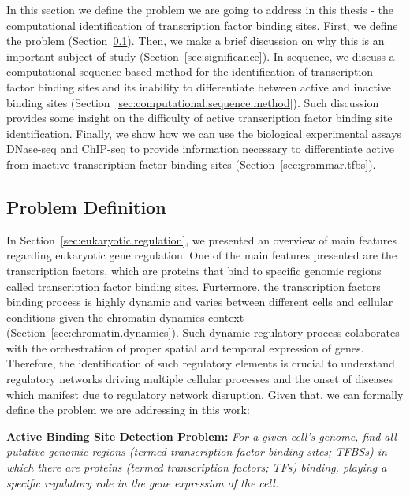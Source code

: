 In this section we define the problem we are going to address in this thesis - the computational identification of transcription factor binding sites. First, we define the problem (Section~\ref{sec:problem.definition}). Then, we make a brief discussion on why this is an important subject of study (Section~\ref{sec:significance}). In sequence, we discuss a computational sequence-based method for the identification of transcription factor binding sites and its inability to differentiate between active and inactive binding sites (Section~\ref{sec:computational.sequence.method}). Such discussion provides some insight on the difficulty of active transcription factor binding site identification. Finally, we show how we can use the biological experimental assays DNase-seq and ChIP-seq to provide information necessary to differentiate active from inactive transcription factor binding sites (Section~\ref{sec:grammar.tfbs}).

\subsection{Problem Definition}
\label{sec:problem.definition}

In Section~\ref{sec:eukaryotic.regulation}, we presented an overview of main features regarding eukaryotic gene regulation. One of the main features presented are the transcription factors, which are proteins that bind to specific genomic regions called transcription factor binding sites. Furtermore, the transcription factors binding process is highly dynamic and varies between different cells and cellular conditions given the chromatin dynamics context (Section~\ref{sec:chromatin.dynamics}). Such dynamic regulatory process colaborates with the orchestration of proper spatial and temporal expression of genes. Therefore, the identification of such regulatory elements is crucial to understand regulatory networks driving multiple cellular processes and the onset of diseases which manifest due to regulatory network disruption. Given that, we can formally define the problem we are addressing in this work:

\vspace{0.5cm}
\noindent
\textbf{Active Binding Site Detection Problem:} \emph{For a given cell's genome, find all putative genomic regions (termed transcription factor binding sites; TFBSs) in which there are proteins (termed transcription factors; TFs) binding, playing a specific regulatory role in the gene expression of the cell.}
\vspace{0.45cm}

